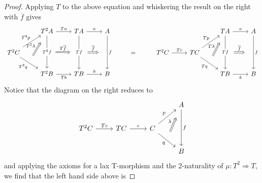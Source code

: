 \documentclass[a4paper,11pt,oneside,openany]{scrbook}
\begin{document}
\begin{proof}
    Applying $T$ to the above equation and whiskering the result on the right
    with $\overline{f}$ gives
    \[\begin{tikzcd}
        & {T^2A} & TA & A &&&& TA & A \\
        {T^2C} &&&& {=} & {T^2C} & TC \\
        & {T^2B} & TB & B &&&& TB & B
        \arrow[""{name=0, anchor=center, inner sep=0}, "{T^2q}"', from=2-1, to=3-2]
        \arrow["Tb"', from=3-2, to=3-3]
        \arrow[""{name=1, anchor=center, inner sep=0}, "Tf"{description}, from=1-3, to=3-3]
        \arrow[""{name=2, anchor=center, inner sep=0}, "{T^2f}"{description}, from=1-2, to=3-2]
        \arrow["Ta", from=1-2, to=1-3]
        \arrow["{T^2p}", from=2-1, to=1-2]
        \arrow["b", from=3-3, to=3-4]
        \arrow[""{name=3, anchor=center, inner sep=0}, "f", from=1-4, to=3-4]
        \arrow["a", from=1-3, to=1-4]
        \arrow[""{name=4, anchor=center, inner sep=0}, "f", from=1-9, to=3-9]
        \arrow["b"', from=3-8, to=3-9]
        \arrow[""{name=5, anchor=center, inner sep=0}, "Tf"{description}, from=1-8, to=3-8]
        \arrow["a", from=1-8, to=1-9]
        \arrow["Tp", from=2-7, to=1-8]
        \arrow[""{name=6, anchor=center, inner sep=0}, "Tq"', from=2-7, to=3-8]
        \arrow["Tc", from=2-6, to=2-7]
        \arrow["{T^2\lambda}", shorten <=12pt, shorten >=12pt, Rightarrow, from=0, to=1-2]
        \arrow["{T\overline{f}}", shorten <=13pt, shorten >=13pt, Rightarrow, from=2, to=1]
        \arrow["{\overline{f}}", shorten <=13pt, shorten >=13pt, Rightarrow, from=1, to=3]
        \arrow["{\overline{f}}", shorten <=13pt, shorten >=13pt, Rightarrow, from=5, to=4]
        \arrow["T\lambda", shorten <=12pt, shorten >=12pt, Rightarrow, from=6, to=1-8]
    \end{tikzcd}\]
    Notice that the diagram on the right reduces to
    \[\begin{tikzcd}
        && {} & A \\
        {T^2C} & TC & C \\
        &&& B
        \arrow["Tc", from=2-1, to=2-2]
        \arrow["c", from=2-2, to=2-3]
        \arrow[""{name=0, anchor=center, inner sep=0}, "q"', from=2-3, to=3-4]
        \arrow["p", from=2-3, to=1-4]
        \arrow["f", from=1-4, to=3-4]
        \arrow["\lambda", shorten <=12pt, shorten >=12pt, Rightarrow, from=0, to=1-4]
    \end{tikzcd}\]
    and applying the axioms for a lax T-morphism and the 2-naturality of
    $\mu\colon T^2\Rightarrow T$, we find that the left hand side above is

\end{proof}
\end{document}
